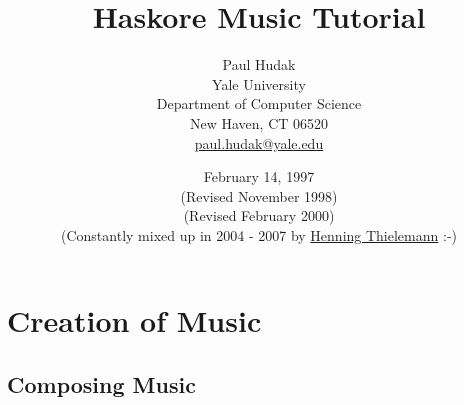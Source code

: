 \documentclass[11pt,fleqn]{article}
\begin{document}
\title{Haskore Music Tutorial}

\author{Paul Hudak\\
Yale University\\
Department of Computer Science\\
New Haven, CT 06520\\
\href{mailto:paul.hudak@yale.edu}{paul.hudak@yale.edu}}

\date{February 14, 1997\\
(Revised November 1998)\\
(Revised February 2000)\\
(Constantly mixed up in 2004 - 2007 by
\href{mailto:haskore@henning-thielemann.de}{Henning Thielemann} :-)}

\maketitle

\pagebreak

\tableofcontents

\pagebreak





\section{Creation of Music}

\subsection{Composing Music}















%

\end{document}
